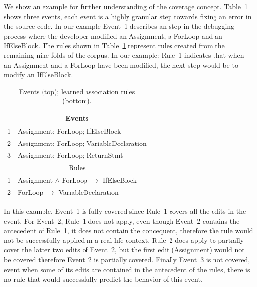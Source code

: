 \documentclass[sigconf]{acmart}
\begin{document}
We show an example for further understanding of the coverage concept.
Table~\ref{rulesandinstances} shows three events, each event is a 
highly granular step towards fixing an error in the source code. In 
our example Event~1 describes an step in the debugging process 
where the developer modified an Assignment, a ForLoop and an IfElseBlock.
The rules shown in Table~\ref{rulesandinstances} represent rules created
from the remaining nine folds of the corpus. In our example: Rule~1 
indicates that when an Assignment and a ForLoop have been modified,
the next step would be to modify an IfElseBlock.


\begin{table}[ht]
  \centering
  \caption{Events (top); learned association rules (bottom). \label{rulesandinstances}}{\small
\begin{tabular}{ll}
\toprule
\multicolumn{2}{c}{Events} \\
\midrule
1 & Assignment; ForLoop; IfElseBlock  \\
2 & Assignment; ForLoop; VariableDeclaration\\  
3 & Assignment; ForLoop;  ReturnStmt \\
\midrule
 \multicolumn{2}{c}{Rules} \\                     
\midrule
1 & Assignment $\wedge$ ForLoop $\rightarrow$ IfElseBlock \\  
2 & ForLoop $\rightarrow$ VariableDeclaration \\   
\bottomrule
\end{tabular}

}
\end{table}

In this example, Event~1 is fully covered since Rule~1 covers all
the edits in the event. For Event~2, Rule~1 does not apply, even though
Event~2 contains the antecedent of Rule~1, it does not contain the 
concequent, therefore the rule would not be successfully applied in a
real-life context. Rule~2 does apply to partially cover the latter two
edits of Event~2, but the first edit (Assignment) would not be covered
therefore Event~2 is partially covered. Finally Event~3 is not covered,
event when some of its edits are contained in the antecedent of the rules,
there is no rule that would successfully predict the behavior of this 
event. 

\end{document}
